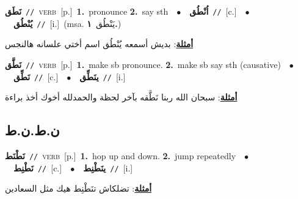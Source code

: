 \documentclass[10pt,a4paper,twoside]{article} %
\begin{document}
\begin{multicols}{2}
{\setlength\topsep{0pt}\textbf{\foreignlanguage{arabic}{نَطَق}}\ {\color{gray}\texttt{//}\color{black}}\ \textsc{verb}\ [p.]\ \textbf{1.}~pronounce  \textbf{2.}~say sth\ \ $\bullet$\ \ \setlength\topsep{0pt}\textbf{\foreignlanguage{arabic}{اُنْطُق}}\ {\color{gray}\texttt{//}\color{black}}\ [c.]\ \ $\bullet$\ \ \setlength\topsep{0pt}\textbf{\foreignlanguage{arabic}{يُنْطُق}}\ {\color{gray}\texttt{//}\color{black}}\ [i.]\ \color{gray}(msa. \foreignlanguage{arabic}{يَنْطُق}~\foreignlanguage{arabic}{\textbf{١.}})\color{black}\  \begin{flushright}\color{gray}\foreignlanguage{arabic}{\textbf{\underline{\foreignlanguage{arabic}{أمثلة}}}: بديش أسمعه يُنْطُق اسم أختي علسانه هالنجس}\end{flushright}\color{black}} \vspace{2mm}

{\setlength\topsep{0pt}\textbf{\foreignlanguage{arabic}{نَطَّق}}\ {\color{gray}\texttt{//}\color{black}}\ \textsc{verb}\ [p.]\ \textbf{1.}~make sb pronounce.  \textbf{2.}~make sb say sth (causative)\ \ $\bullet$\ \ \setlength\topsep{0pt}\textbf{\foreignlanguage{arabic}{نَطِّق}}\ {\color{gray}\texttt{//}\color{black}}\ [c.]\ \ $\bullet$\ \ \setlength\topsep{0pt}\textbf{\foreignlanguage{arabic}{ينَطِّق}}\ {\color{gray}\texttt{//}\color{black}}\ [i.]\  \begin{flushright}\color{gray}\foreignlanguage{arabic}{\textbf{\underline{\foreignlanguage{arabic}{أمثلة}}}: سبحان الله ربنا نَطَّقه بآخر لحظة والحمدلله أخوك أخذ براءة}\end{flushright}\color{black}} \vspace{2mm}

\vspace{-3mm}
\subsection*{\color{blue}\foreignlanguage{arabic}{ن.ط.ن.ط}\color{blue}{}} 

{\setlength\topsep{0pt}\textbf{\foreignlanguage{arabic}{نَطْنَط}}\ {\color{gray}\texttt{//}\color{black}}\ \textsc{verb}\ [p.]\ \textbf{1.}~hop up and down.  \textbf{2.}~jump repeatedly\ \ $\bullet$\ \ \setlength\topsep{0pt}\textbf{\foreignlanguage{arabic}{نَطْنِط}}\ {\color{gray}\texttt{//}\color{black}}\ [c.]\ \ $\bullet$\ \ \setlength\topsep{0pt}\textbf{\foreignlanguage{arabic}{ينَطْنِط}}\ {\color{gray}\texttt{//}\color{black}}\ [i.]\  \begin{flushright}\color{gray}\foreignlanguage{arabic}{\textbf{\underline{\foreignlanguage{arabic}{أمثلة}}}: تضلكاش تنَطْنِط هيك مثل السعادين}\end{flushright}\color{black}} \vspace{2mm}


\end{multicols}
\end{document}
